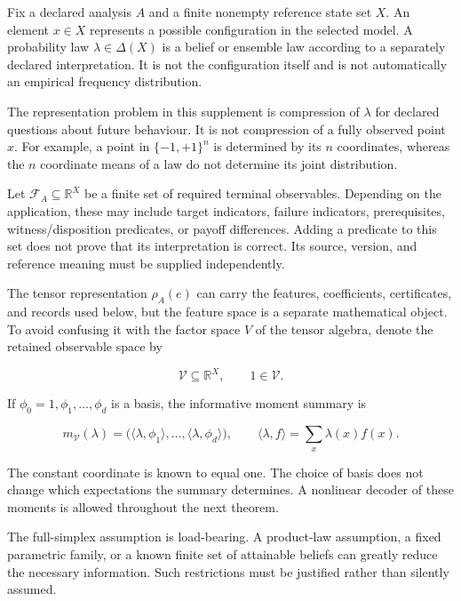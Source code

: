 \documentclass[11pt,a4paper]{article}
\begin{document}
Fix a declared analysis \(A\) and a finite nonempty reference state set
\(X\). An element \(x\in X\) represents a possible configuration in the
selected model. A probability law \(\lambda\in\Delta(X)\) is a belief or
ensemble law according to a separately declared interpretation. It is
not the configuration itself and is not automatically an empirical
frequency distribution.

The representation problem in this supplement is compression of
\(\lambda\) for declared questions about future behaviour. It is not
compression of a fully observed point \(x\). For example, a point in
\(\{-1,+1\}^n\) is determined by its \(n\) coordinates, whereas the
\(n\) coordinate means of a law do not determine its joint distribution.

Let \(\mathscr F_A\subseteq\mathbb R^X\) be a finite set of required
terminal observables. Depending on the application, these may include
target indicators, failure indicators, prerequisites,
witness/disposition predicates, or payoff differences. Adding a
predicate to this set does not prove that its interpretation is correct.
Its source, version, and reference meaning must be supplied
independently.

The tensor representation \(\rho_A(e)\) can carry the features,
coefficients, certificates, and records used below, but the feature
space is a separate mathematical object. To avoid confusing it with the
factor space \(V\) of the tensor algebra, denote the retained observable
space by

\nopagebreak[4]

\[
\mathscr V\subseteq\mathbb R^X,\qquad 1\in\mathscr V.
\]

If \(\phi_0=1,\phi_1,\ldots,\phi_d\) is a basis, the informative moment
summary is

\nopagebreak[4]

\[
m_{\mathscr V}(\lambda)
 =\bigl(\langle\lambda,\phi_1\rangle,\ldots,
         \langle\lambda,\phi_d\rangle\bigr),
\qquad
\langle\lambda,f\rangle=\sum_x\lambda(x)f(x).
\]

The constant coordinate is known to equal one. The choice of basis does
not change which expectations the summary determines. A nonlinear
decoder of these moments is allowed throughout the next theorem.

The full-simplex assumption is load-bearing. A product-law assumption, a
fixed parametric family, or a known finite set of attainable beliefs can
greatly reduce the necessary information. Such restrictions must be
justified rather than silently assumed.
\end{document}
